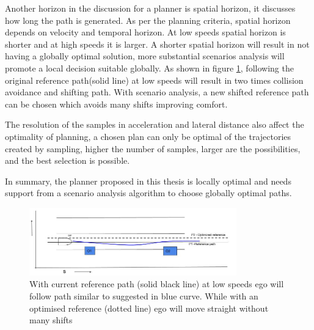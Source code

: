 Another horizon in the discussion for a planner is spatial horizon, it discusses how long the path is generated. As per the planning criteria, spatial horizon depends on velocity and temporal horizon. At low speeds spatial horizon is shorter and at high speeds it is larger. A shorter spatial horizon will result in not having a globally optimal solution, more substantial scenarios analysis will promote a local decision suitable globally. As shown in figure \ref{optimized_reference}, following the original reference path(solid line) at low speeds will result in two times collision avoidance and shifting path. With scenario analysis, a new shifted reference path can be chosen which avoids many shifts improving comfort.

The resolution of the samples in acceleration and lateral distance also affect the optimality of planning, a chosen plan can only be optimal of the trajectories created by sampling, higher the number of samples, larger are the possibilities, and the best selection is possible. 

In summary, the planner proposed in this thesis is locally optimal and needs support from a scenario analysis algorithm to choose globally optimal paths. 
 
 \begin{figure}[h]
    \centering
    \includegraphics[width=0.8\textwidth]{Images/evaluation/optimized_reference.jpg}
    \caption{With current reference path (solid black line) at low speeds ego will follow path similar to suggested in blue curve. While with an optimised reference (dotted line) ego will move straight without many shifts}
    \label{optimized_reference}
\end{figure}

